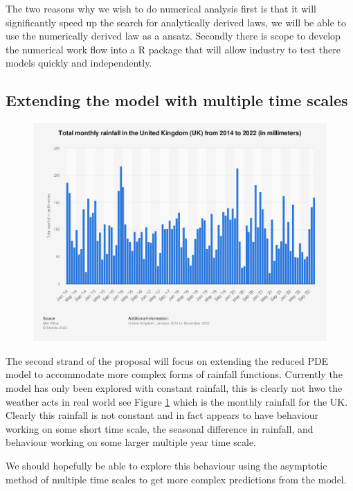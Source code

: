 \documentclass[11pt]{article}
\begin{document}
\vspace{5pt}

\qquad The two reasons why we wish to do numerical analysis first is that it will significantly speed up the search for analytically derived laws, we will be able to use the numerically derived law as a ansatz. Secondly there is scope to develop the numerical work flow into a R package that will allow industry to test there models quickly and independently.



\subsection{Extending the model with multiple time scales}

\begin{minipage}{0.45\textwidth}
    \begin{figure}[H]
    \centering
    \includegraphics[width=\textwidth]{Figs/Rainfall.png}
    \label{fig:rainfall}
    \end{figure}
\end{minipage}
\hspace{0.05\textwidth}
\indent\begin{minipage}{0.45\textwidth}
    The second strand of the proposal will focus on extending the reduced PDE model to accommodate more complex forms of rainfall functions. Currently the model has only been explored with constant rainfall, this is clearly not hwo the weather acts in real world see Figure \ref{fig:rainfall} which is the monthly rainfall for the UK. 
    Clearly this rainfall is not constant and in fact appears to have behaviour working on some short time scale, the seasonal difference in rainfall, and behaviour working on some larger multiple year time scale.

    \qquad We should hopefully be able to explore this behaviour using the asymptotic method of multiple time scales to get more complex predictions from the model.
\end{minipage}
\end{document}
